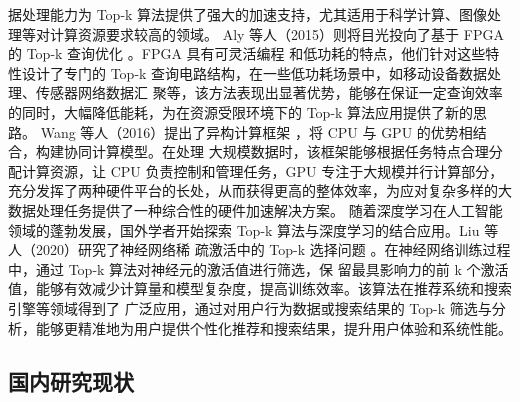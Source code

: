 据处理能力为 Top-k 算法提供了强大的加速支持，尤其适用于科学计算、图像处理等对计算资源要求较高的领域。
Aly 等人（2015）则将目光投向了基于 FPGA 的 Top-k 查询优化 \cite {aly2015}。FPGA 具有可灵活编程
和低功耗的特点，他们针对这些特性设计了专门的 Top-k 查询电路结构，在一些低功耗场景中，如移动设备数据处理、传感器网络数据汇
聚等，该方法表现出显著优势，能够在保证一定查询效率的同时，大幅降低能耗，为在资源受限环境下的 Top-k 算法应用提供了新的思路。
Wang 等人（2016）提出了异构计算框架 \cite {wang2016}，将 CPU 与 GPU 的优势相结合，构建协同计算模型。在处理
大规模数据时，该框架能够根据任务特点合理分配计算资源，让 CPU 负责控制和管理任务，GPU 专注于大规模并行计算部分，充分发挥了两种硬件平台的长处，从而获得更高的整体效率，为应对复杂多样的大数据处理任务提供了一种综合性的硬件加速解决方案。
随着深度学习在人工智能领域的蓬勃发展，国外学者开始探索 Top-k 算法与深度学习的结合应用。Liu 等人（2020）研究了神经网络稀
疏激活中的 Top-k 选择问题 \cite {liu2020}。在神经网络训练过程中，通过 Top-k 算法对神经元的激活值进行筛选，保
留最具影响力的前 k 个激活值，能够有效减少计算量和模型复杂度，提高训练效率。该算法在推荐系统和搜索引擎等领域得到了
广泛应用，通过对用户行为数据或搜索结果的 Top-k 筛选与分析，能够更精准地为用户提供个性化推荐和搜索结果，提升用户体验和系统性能。




\subsection{国内研究现状}



